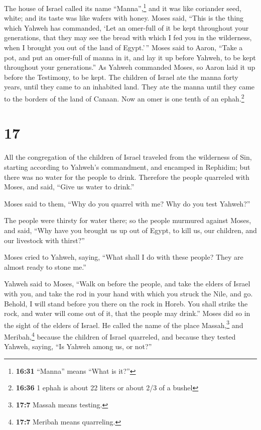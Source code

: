  The house of Israel called its name
``Manna'',\footnote{\textbf{16:31} ``Manna'' means ``What is it?''} and
it was like coriander seed, white; and its taste was like wafers with
honey.  Moses said, ``This is the thing which Yahweh has
commanded, `Let an omer-full of it be kept throughout your generations,
that they may see the bread with which I fed you in the wilderness, when
I brought you out of the land of Egypt.'\,''  Moses said
to Aaron, ``Take a pot, and put an omer-full of manna in it, and lay it
up before Yahweh, to be kept throughout your generations.''
 As Yahweh commanded Moses, so Aaron laid it up before
the Testimony, to be kept.  The children of Israel ate
the manna forty years, until they came to an inhabited land. They ate
the manna until they came to the borders of the land of Canaan.
 Now an omer is one tenth of an ephah.\footnote{\textbf{16:36}
  1 ephah is about 22 liters or about 2/3 of a bushel}

\hypertarget{section-16}{%
\section{17}\label{section-16}}

 All the congregation of the children of Israel traveled
from the wilderness of Sin, starting according to Yahweh's commandment,
and encamped in Rephidim; but there was no water for the people to
drink.  Therefore the people quarreled with Moses, and
said, ``Give us water to drink.''

Moses said to them, ``Why do you quarrel with me? Why do you test
Yahweh?''

 The people were thirsty for water there; so the people
murmured against Moses, and said, ``Why have you brought us up out of
Egypt, to kill us, our children, and our livestock with thirst?''

 Moses cried to Yahweh, saying, ``What shall I do with
these people? They are almost ready to stone me.''

 Yahweh said to Moses, ``Walk on before the people, and
take the elders of Israel with you, and take the rod in your hand with
which you struck the Nile, and go.  Behold, I will stand
before you there on the rock in Horeb. You shall strike the rock, and
water will come out of it, that the people may drink.'' Moses did so in
the sight of the elders of Israel.  He called the name of
the place Massah,\footnote{\textbf{17:7} Massah means testing.} and
Meribah,\footnote{\textbf{17:7} Meribah means quarreling.} because the
children of Israel quarreled, and because they tested Yahweh, saying,
``Is Yahweh among us, or not?''

